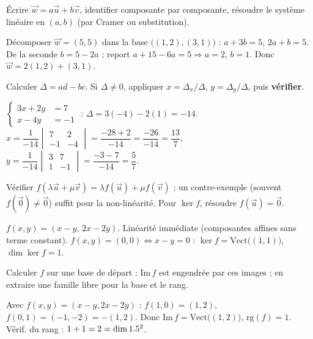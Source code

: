 Écrire $\vec w=a\vec u+b\vec v$, identifier composante par composante, résoudre le système
linéaire en $(a,b)$ (par Cramer ou substitution).
\begin{exemple}
Décomposer $\vec w=(5,5)$ dans la base $\big((1,2),(3,1)\big)$ : $a+3b=5$, $2a+b=5$. De la
seconde $b=5-2a$ ; report $a+15-6a=5\Rightarrow a=2$, $b=1$. Donc $\vec w=2(1,2)+(3,1)$.
\end{exemple}

Calculer $\Delta=ad-bc$. Si $\Delta\neq0$, appliquer $x=\Delta_x/\Delta$, $y=\Delta_y/\Delta$,
puis \textbf{vérifier}.
\begin{exemple}
$\left\{\begin{aligned}3x+2y&=7\\ x-4y&=-1\end{aligned}\right.$ : $\Delta=3(-4)-2(1)=-14$.
$x=\dfrac{1}{-14}\begin{vmatrix}7&2\\-1&-4\end{vmatrix}=\dfrac{-28+2}{-14}=\dfrac{-26}{-14}=\dfrac{13}{7}$,\;
$y=\dfrac{1}{-14}\begin{vmatrix}3&7\\1&-1\end{vmatrix}=\dfrac{-3-7}{-14}=\dfrac{5}{7}$.
\end{exemple}

Vérifier $f(\lambda\vec u+\mu\vec v)=\lambda f(\vec u)+\mu f(\vec v)$ ; un contre-exemple (souvent
$f(\vec 0)\neq\vec 0$) suffit pour la non-linéarité. Pour $\ker f$, résoudre $f(\vec u)=\vec0$.
\begin{exemple}
$f(x,y)=(x-y,\,2x-2y)$. Linéarité immédiate (composantes affines sans terme constant).
$f(x,y)=(0,0)\Leftrightarrow x-y=0$ : $\ker f=\mathrm{Vect}\big((1,1)\big)$, $\dim\ker f=1$.
\end{exemple}

Calculer $f$ sur une base de départ : $\mathrm{Im}\,f$ est engendrée par ces images ; en extraire
une famille libre pour la base et le rang.
\begin{exemple}
Avec $f(x,y)=(x-y,2x-2y)$ : $f(1,0)=(1,2)$, $f(0,1)=(-1,-2)=-(1,2)$. Donc
$\mathrm{Im}\,f=\mathrm{Vect}\big((1,2)\big)$, $\mathrm{rg}(f)=1$. Vérif. du rang : $1+1=2=\dim1.5^2$. \checkmark
\end{exemple}


